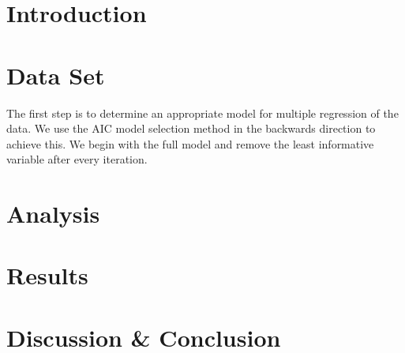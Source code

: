 \documentclass[10pt,twocolumn]{article}
\begin{document}
	\maketitle
	\begin{abstract}
	\end{abstract}

	\section{Introduction}
	
	\section{Data Set}
	
		The first step is to determine an appropriate model for multiple regression of the data. We use the AIC model selection method in the backwards direction to achieve this. We begin with the full model and remove the least informative variable after every iteration. 
	
	\section{Analysis}
	
	\section{Results}
	
	\section{Discussion \& Conclusion}
\end{document}
